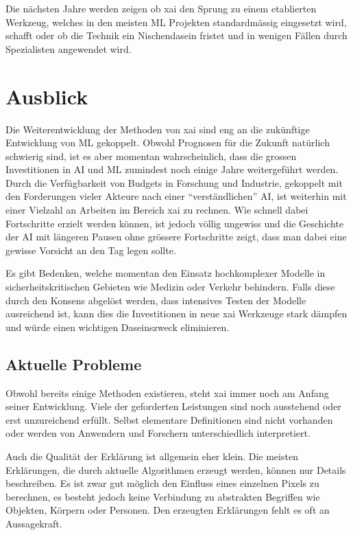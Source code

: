 \documentclass[
  12pt, %
  a4paper, %
  oneside, %
  openany, 
  numbers=noenddot, %
  BCOR=5mm, %
  parskip=half*, %
  thesis, %
]{bfhbook}
\begin{document}
Die nächsten Jahre werden zeigen ob \Gls{xai} den Sprung zu einem etablierten Werkzeug, welches in den meisten \Gls{ML} Projekten standardmässig eingesetzt wird, schafft oder ob die Technik ein Nischendasein fristet und in wenigen Fällen durch Spezialisten angewendet wird.

\chapter{Ausblick}
Die Weiterentwicklung der Methoden von \Gls{xai} sind eng an die zukünftige Entwicklung von \Gls{ML} gekoppelt. Obwohl Prognosen für die Zukunft natürlich schwierig sind, ist es aber momentan wahrscheinlich, dass die grossen Investitionen in \Gls{AI} und \Gls{ML} zumindest noch einige Jahre weitergeführt werden. Durch die Verfügbarkeit von Budgets in Forschung und Industrie, gekoppelt mit den Forderungen vieler Akteure nach einer ``verständlichen'' \Gls{AI}, ist weiterhin mit einer Vielzahl an Arbeiten im Bereich \Gls{xai} zu rechnen. Wie schnell dabei Fortschritte erzielt werden können, ist jedoch völlig ungewiss und die Geschichte der \Gls{AI} mit längeren Pausen ohne grössere Fortschritte zeigt, dass man dabei eine gewisse Vorsicht an den Tag legen sollte.

Es gibt Bedenken, welche momentan den Einsatz hochkomplexer Modelle in sicherheitskritischen Gebieten wie Medizin oder Verkehr behindern. Falls diese durch den Konsens abgelöst werden, dass intensives Testen der Modelle ausreichend ist, kann dies die Investitionen in neue \Gls{xai} Werkzeuge stark dämpfen und würde einen wichtigen Daseinszweck eliminieren.

\section{Aktuelle Probleme}
Obwohl bereits einige Methoden existieren, steht \Gls{xai} immer noch am Anfang seiner Entwicklung. Viele der geforderten Leistungen  sind noch ausstehend oder erst unzureichend erfüllt. Selbst elementare Definitionen sind nicht vorhanden oder werden von Anwendern und Forschern unterschiedlich interpretiert.  

Auch die Qualität der Erklärung ist allgemein eher klein. Die meisten Erklärungen, die durch aktuelle Algorithmen erzeugt werden, können nur Details beschreiben. Es ist zwar gut möglich den Einfluss eines einzelnen Pixels zu berechnen, es besteht jedoch keine Verbindung zu abstrakten Begriffen wie Objekten, Körpern oder Personen. Den erzeugten Erklärungen fehlt es oft an Aussagekraft.
\end{document}
